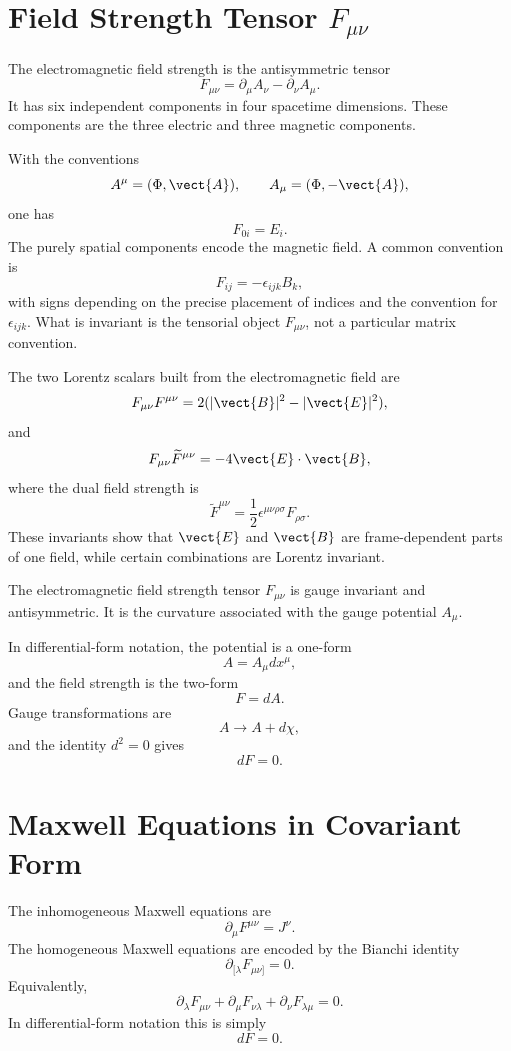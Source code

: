 \section{Field Strength Tensor \texorpdfstring{\(F_{\mu\nu}\)}{Fmunu}}

The electromagnetic field strength is the antisymmetric tensor
\[
    F_{\mu\nu}=\partial_\mu A_\nu-\partial_\nu A_\mu.
\]
It has six independent components in four spacetime dimensions. These components
are the three electric and three magnetic components.

With the conventions
\[
    A^\mu=(\Phi,\vect{A}),
    \qquad
    A_\mu=(\Phi,-\vect{A}),
\]
one has
\[
    F_{0i}=E_i.
\]
The purely spatial components encode the magnetic field. A common convention is
\[
    F_{ij}=-\epsilon_{ijk}B_k,
\]
with signs depending on the precise placement of indices and the convention for
\(\epsilon_{ijk}\). What is invariant is the tensorial object \(F_{\mu\nu}\), not
a particular matrix convention.

The two Lorentz scalars built from the electromagnetic field are
\[
    F_{\mu\nu}F^{\mu\nu}=2(|\vect{B}|^2-|\vect{E}|^2),
\]
and
\[
    F_{\mu\nu}\widetilde{F}^{\mu\nu}=-4\vect{E}\cdot\vect{B},
\]
where the dual field strength is
\[
    \widetilde{F}^{\mu\nu}=\frac{1}{2}\epsilon^{\mu\nu\rho\sigma}F_{\rho\sigma}.
\]
These invariants show that \(\vect{E}\) and \(\vect{B}\) are frame-dependent
parts of one field, while certain combinations are Lorentz invariant.

\begin{definitionbox}
The electromagnetic field strength tensor \(F_{\mu\nu}\) is gauge invariant and
antisymmetric. It is the curvature associated with the gauge potential \(A_\mu\).
\end{definitionbox}

In differential-form notation, the potential is a one-form
\[
    A=A_\mu dx^\mu,
\]
and the field strength is the two-form
\[
    F=dA.
\]
Gauge transformations are
\[
    A\longrightarrow A+d\chi,
\]
and the identity \(d^2=0\) gives
\[
    dF=0.
\]

\section{Maxwell Equations in Covariant Form}

The inhomogeneous Maxwell equations are
\[
    \partial_\mu F^{\mu\nu}=J^\nu.
\]
The homogeneous Maxwell equations are encoded by the Bianchi identity
\[
    \partial_{[\lambda}F_{\mu\nu]}=0.
\]
Equivalently,
\[
    \partial_\lambda F_{\mu\nu}
    +\partial_\mu F_{\nu\lambda}
    +\partial_\nu F_{\lambda\mu}=0.
\]
In differential-form notation this is simply
\[
    dF=0.
\]


